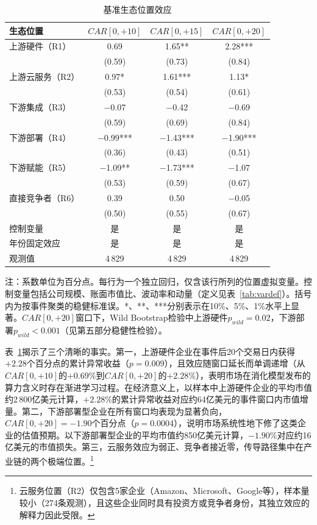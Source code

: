 \documentclass[11pt,fontset=fandol,a4paper]{ctexart}
\begin{document}
\begin{table}[H]
\centering
\small
\begin{threeparttable}
\caption{基准生态位置效应}
\label{tab:baseline}
\begin{tabular}{lccc}
\toprule
生态位置 & $CAR[0,+10]$ & $CAR[0,+15]$ & $CAR[0,+20]$ \\
\midrule
上游硬件（R1） & 0.69 & 1.65** & 2.28*** \\
 & (0.59) & (0.73) & (0.84) \\[3pt]
上游云服务（R2） & 0.97* & 1.61*** & 1.13* \\
 & (0.53) & (0.54) & (0.61) \\[3pt]
下游集成（R3） & $-$0.07 & $-$0.42 & $-$0.69 \\
 & (0.59) & (0.69) & (0.84) \\[3pt]
下游部署（R4） & $-$0.99*** & $-$1.43*** & $-$1.90*** \\
 & (0.36) & (0.43) & (0.51) \\[3pt]
下游赋能（R5） & $-$1.09** & $-$1.73*** & $-$1.07 \\
 & (0.53) & (0.59) & (0.67) \\[3pt]
直接竞争者（R6） & 0.39 & 0.50 & $-$0.05 \\
 & (0.50) & (0.55) & (0.67) \\
\midrule
控制变量 & 是 & 是 & 是 \\
年份固定效应 & 是 & 是 & 是 \\
观测值 & 4\,829 & 4\,829 & 4\,829 \\
\bottomrule
\end{tabular}
\begin{tablenotes}
\footnotesize
\item 注：系数单位为百分点。每行为一个独立回归，仅含该行所列的位置虚拟变量。控制变量包括公司规模、账面市值比、波动率和动量（定义见表~\ref{tab:vardef}）。括号内为按事件聚类的稳健标准误。*、**、***分别表示在10\%、5\%、1\%水平上显著。$CAR[0,+20]$窗口下，Wild Bootstrap检验中上游硬件$p_{wild}=0.02$，下游部署$p_{wild}<0.001$（见第五部分稳健性检验）。
\end{tablenotes}
\end{threeparttable}
\end{table}

表~\ref{tab:baseline}揭示了三个清晰的事实。第一，上游硬件企业在事件后20个交易日内获得$+2.28$个百分点的累计异常收益（$p=0.009$），且效应随窗口延长而单调递增（从$CAR[0,+10]$的$+0.69\%$到$CAR[0,+20]$的$+2.28\%$），表明市场在消化模型发布的算力含义时存在渐进学习过程。在经济意义上，以样本中上游硬件企业的平均市值约2\,800亿美元计算，$+2.28\%$的累计异常收益对应约64亿美元的事件窗口内市值增量。第二，下游部署型企业在所有窗口均表现为显著负向，$CAR[0,+20]=-1.90$个百分点（$p=0.0004$），说明市场系统性地下修了这类企业的估值预期。以下游部署型企业的平均市值约850亿美元计算，$-1.90\%$对应约16亿美元的市值损失。第三，云服务效应为弱正、竞争者接近零，传导路径集中在产业链的两个极端位置。\footnote{云服务位置（R2）仅包含5家企业（Amazon、Microsoft、Google等），样本量较小（274条观测），且这些企业同时具有投资方或竞争者身份，其独立效应的解释力因此受限。}
\end{document}
